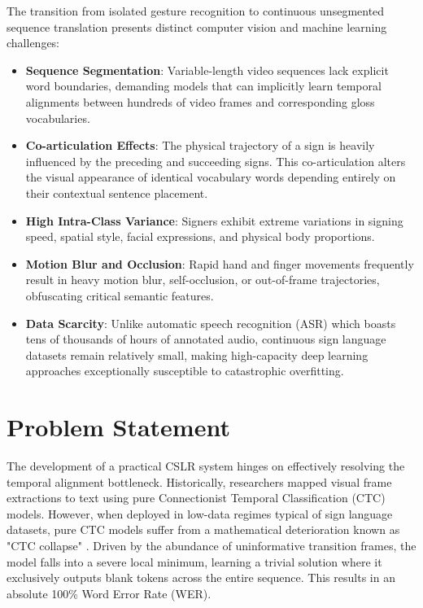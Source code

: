 The transition from isolated gesture recognition to continuous unsegmented sequence translation presents distinct computer vision and machine learning challenges:
\begin{itemize}
    \item \textbf{Sequence Segmentation}: Variable-length video sequences lack explicit word boundaries, demanding models that can implicitly learn temporal alignments between hundreds of video frames and corresponding gloss vocabularies.
    \item \textbf{Co-articulation Effects}: The physical trajectory of a sign is heavily influenced by the preceding and succeeding signs. This co-articulation alters the visual appearance of identical vocabulary words depending entirely on their contextual sentence placement.
    \item \textbf{High Intra-Class Variance}: Signers exhibit extreme variations in signing speed, spatial style, facial expressions, and physical body proportions.
    \item \textbf{Motion Blur and Occlusion}: Rapid hand and finger movements frequently result in heavy motion blur, self-occlusion, or out-of-frame trajectories, obfuscating critical semantic features.
    \item \textbf{Data Scarcity}: Unlike automatic speech recognition (ASR) which boasts tens of thousands of hours of annotated audio, continuous sign language datasets remain relatively small, making high-capacity deep learning approaches exceptionally susceptible to catastrophic overfitting.
\end{itemize}

\section{Problem Statement}

The development of a practical CSLR system hinges on effectively resolving the temporal alignment bottleneck. Historically, researchers mapped visual frame extractions to text using pure Connectionist Temporal Classification (CTC) models. However, when deployed in low-data regimes typical of sign language datasets, pure CTC models suffer from a mathematical deterioration known as "CTC collapse" \cite{graves2006connectionist}. Driven by the abundance of uninformative transition frames, the model falls into a severe local minimum, learning a trivial solution where it exclusively outputs blank tokens across the entire sequence. This results in an absolute 100\% Word Error Rate (WER).

